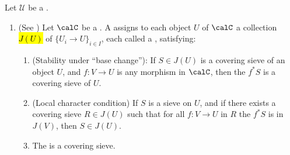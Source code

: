 \begin{definition} \label{definition:grothendieck_topology_on_a_category_site_covering_sieve_topologically_generating_family}
    Let $\mathscr{U}$ be a .
    \begin{enumerate}
        \item (See \cite[Expos\'e II, D\'efinition 1.1]{SGA4_I}) Let $\calC$ be a . A  assigns to each object $U$ of $\calC$ a collection \hl{$J(U)$} of  $\{U_i \to U\}_{i \in I}$, each called a , satisfying:
        \begin{enumerate}
            \item (Stability under ``base change''): If $S \in J(U)$ is a covering sieve of an object $U$, and $f: V \to U$ is any morphism in $\calC$, then the  $f^* S$ is a covering sieve of $U$.
            \item (Local character condition) If $S$ is a sieve on $U$, and if there exists a covering sieve $R \in J(U)$ such that for all $f: V \to U$ in $R$ the  $f^* S$ is in $J(V)$, then $S \in J(U)$. 
            
            \item The  is a covering sieve.
        \end{enumerate}




\end{enumerate}
\end{definition}

